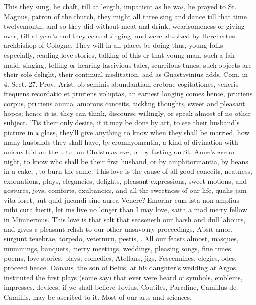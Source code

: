 This they sung, he chaft, till at length, impatient as he was, he
prayed to St. Magnus, patron of the church, they might all three sing
and dance till that time twelvemonth, and so they did without
meat and drink, wearisomeness or giving over, till at year's end they
ceased singing, and were absolved by Herebertus archbishop of Cologne.
They will in all places be doing thus, young folks especially, reading
love stories, talking of this or that young man, such a fair maid,
singing, telling or hearing lascivious tales, scurrilous tunes, such
objects are their sole delight, their continual meditation, and as
Guastavinius adds, Com. in 4. Sect. 27. Prov. Arist. ob seminis
abundantiam crebrae cogitationes, veneris frequens recordatio et
pruriens voluptas, \etc{} an earnest longing comes hence, pruriens corpus,
pruriens anima, amorous conceits, tickling thoughts, sweet and pleasant
hopes; hence it is, they can think, discourse willingly, or speak
almost of no other subject. 'Tis their only desire, if it may be done
by art, to see their husband's picture in a glass, they'll give
anything to know when they shall be married, how many husbands they
shall have, by cromnyomantia, a kind of divination with onions
laid on the altar on Christmas eve, or by fasting on St. Anne's eve or
night, to know who shall be their first husband, or by amphitormantia,
by beans in a cake, \etc{}, to burn the same. This love is the cause of
all good conceits,  neatness, exornations, plays, elegancies,
delights, pleasant expressions, sweet motions, and gestures, joys,
comforts, exultancies, and all the sweetness of our life, qualis
jam vita foret, aut quid jucundi sine aurea Venere? Emoriar cum
ista non amplius mihi cura fuerit, let me live no longer than I may
love, saith a mad merry fellow in Mimnermus. This love is that salt
that seasoneth our harsh and dull labours, and gives a pleasant relish
to our other unsavoury proceedings, Absit amor, surgunt tenebrae,
torpedo, veternum, pestis, \etc{}. All our feasts almost, masques,
mummings, banquets, merry meetings, weddings, pleasing songs, fine
tunes, poems, love stories, plays, comedies, Atellans, jigs,
Fescennines, elegies, odes, \etc{} proceed hence. Danaus, the son of
Belus, at his daughter's wedding at Argos, instituted the first plays
(some say) that ever were heard of symbols, emblems, impresses,
devices, if we shall believe Jovius, Coutiles, Paradine, Camillus de
Camillis, may be ascribed to it. Most of our arts and sciences,

